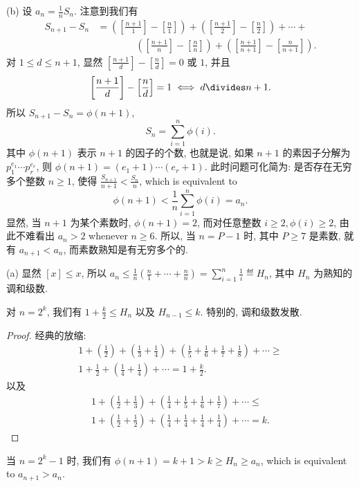 \documentclass{article}
\begin{document}
\begin{soln}
(b) 设 $a_n = \frac{1}{n}S_n$. 注意到我们有
\[
\begin{aligned}
S_{n+1} - S_n &= \left(\left[\frac{n+1}{1}\right] - \left[\frac{n}{1}\right]\right) + \left(\left[\frac{n+1}{2}\right] - \left[\frac{n}{2}\right]\right) + \cdots + \\
&\phantom{===}\left(\left[\frac{n+1}{n}\right] - \left[\frac{n}{n}\right]\right)
+ \left(\left[\frac{n+1}{n+1}\right] - \left[\frac{n}{n+1}\right]\right).
\end{aligned}
\]
对 $1 \le d \le n+1$, 显然 $[\frac{n+1}{d}] - [\frac{n}{d}] = 0$ 或 $1$, 并且
\[
\left[\frac{n+1}{d}\right] - \left[\frac{n}{d}\right] = 1 \iff d \divides n+1.
\]
所以 $S_{n+1} - S_n = \phi(n+1)$,
\begin{equation}
\label{eq9}
S_n = \sum_{i=1}^n \phi(i).
\end{equation}
其中 $\phi(n+1)$ 表示 $n+1$ 的因子的个数,
也就是说, 如果 $n+1$ 的素因子分解为 $p_1^{e_1}\cdots p_r^{e_r}$,
则 $\phi(n+1) = (e_1+1)\cdots(e_r+1)$.
此时问题可化简为: 是否存在无穷多个整数 $n \ge 1$,
使得 $\frac{S_{n+1}}{n+1} < \frac{S_n}{n}$, which is equivalent to
\begin{equation}
\label{eq10}
\phi(n+1) < \frac{1}{n}\sum_{i=1}^n \phi(i) = a_n.
\end{equation}
显然, 当 $n+1$ 为某个素数时, $\phi(n+1) = 2$,
而对任意整数 $i \ge 2, \phi(i) \ge 2$,
由此不难看出 $a_n > 2$ whenever $n \ge 6$.
所以, 当 $n = P-1$ 时, 其中 $P \ge 7$ 是素数, 就有 $a_{n+1} < a_n$,
而素数熟知是有无穷多个的.

(a) 显然 $[x] \le x$, 所以 $a_n \le \frac{1}{n}(\frac{n}{1} + \cdots + \frac{n}{n})
=\sum_{i=1}^n\frac{1}{i} \eqdef H_n$, 其中 $H_n$ 为熟知的调和级数.

\begin{lem}
对 $n=2^k$, 我们有 $1 + \frac{k}{2} \le H_n$ 以及 $H_{n-1} \le k$.
特别的, 调和级数发散.
\end{lem}

\begin{proof}
经典的放缩:
\begin{multline*}
1 + \left(\frac{1}{2}\right) +\left(\frac{1}{3} + \frac{1}{4}\right)
+ \left(\frac{1}{5} + \frac{1}{6} + \frac{1}{7} + \frac{1}{8}\right) + \cdots
\ge\\ 1 + \frac{1}{2} + \left(\frac{1}{4} + \frac{1}{4}\right) + \cdots = 1 + \frac{k}{2}.
\end{multline*}
以及
\begin{multline*}
1 + \left(\frac{1}{2} + \frac{1}{3}\right) +
\left(\frac{1}{4} + \frac{1}{5} + \frac{1}{6} + \frac{1}{7}\right) + \cdots
\le\\ 1 + \left(\frac{1}{2} + \frac{1}{2}\right) +
\left(\frac{1}{4} + \frac{1}{4} + \frac{1}{4} + \frac{1}{4}\right) + \cdots = k.
\end{multline*}
\end{proof}

当 $n=2^k-1$ 时, 我们有 $\phi(n+1) = k+1 > k \ge H_n \ge a_n$,
which is equivalent to $a_{n+1} > a_n$.
\end{soln}
\end{document}
